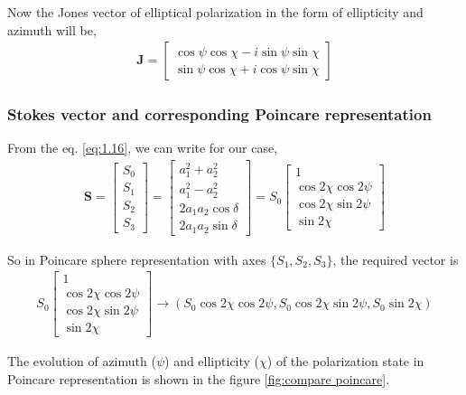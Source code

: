 \documentclass[11pt,a4paper]{article}
\numberwithin{equation}{section}
\begin{document}
Now the Jones vector of elliptical polarization in the form of ellipticity and azimuth will be, \cite{WO}
\begin{align}
	\boldsymbol{J}= 
		\begin{bmatrix}
			\cos\psi\cos\chi- i \sin\psi\sin\chi \\
			\sin\psi\cos\chi+ i \cos\psi\sin\chi
		\end{bmatrix}
\end{align}

\subsubsection{Stokes vector and corresponding Poincare representation}
From the eq. \ref{eq:1.16}, we can write for our case, 
\begin{align}
	\boldsymbol{S}= \begin{bmatrix} S_0\\ S_1\\ S_2\\S_3\end{bmatrix} =
	\begin{bmatrix}
		{a_1^2 + a_2^2}\\
		{a_1^2 - a_2^2}\\
		{2a_1a_2\cos\delta}\\
		{2a_1a_2\sin\delta}
	\end{bmatrix}=S_0
	\begin{bmatrix}
		1\\
		\cos 2\chi \cos 2\psi\\
		\cos 2\chi \sin 2\psi\\
		\sin 2\chi
	\end{bmatrix}
\end{align}

So in Poincare sphere representation with axes $\{S_1, S_2, S_3\}$, the required vector is
\begin{align}
	S_0
	\begin{bmatrix}
		1\\
		\cos 2\chi \cos 2\psi\\
		\cos 2\chi \sin 2\psi\\
		\sin 2\chi
	\end{bmatrix}\longrightarrow
	(S_0\cos 2\chi \cos 2\psi, S_0\cos 2\chi \sin 2\psi, S_0\sin 2\chi)
\end{align}

The evolution of azimuth ($\psi$) and ellipticity ($\chi$) of the polarization state in Poincare representation is shown in the figure \ref{fig:compare poincare}.
\end{document}

